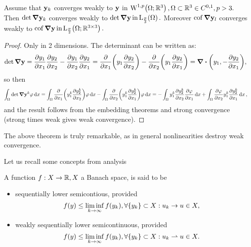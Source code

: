 \documentclass[11pt]{scrartcl} %
\begin{document}
\begin{theorem}[Magic]
	Assume that $\vb{y}_k$ converges weakly to $\vb{y}$ in $\WkpSet[1][p]{\Omega;\R^3}, \Omega \subset \R^3 \in C^{0,1}, p>3.$ Then $\det \grad \vb{y}_k$ converges weakly to $\det \grad \vb{y} \, \text{in} \, \LpSet[\frac{p}{3}]{\Omega}.$ Moreover $\operatorname{cof} \grad \vb{y}_l$ converges weakly to $\cof \grad \vb{y} \, \text{in} \, \LpSet[\frac{p}{2}]{\Omega;\R^{3 \times 3}}.$
\end{theorem}

\begin{proof}
	Only in 2 dimensions. The determinant can be written as:
	\[
		\det \grad \vb{y} = \pdv{y_1}{x_1}\pdv{y_2}{x_2}-\pdv{y_1}{x_2}\pdv{y_2}{x_1} = \pdv{x_1}\qty(y_1 \pdv{y_2}{x_2})-\pdv{x_2}\qty(y_1 \pdv{y_2}{x_1}) = \divergence{\qty(y_1,-\pdv{y_2}{x_1})},
	\]
	so then
	\[
		\int_{\Omega}\det \grad \vb{y}^k \varphi \dd{x} = \int_{\Omega}\pdv{x_1} \qty(y^k_1 \pdv{y_2^k}{x_2})\varphi\dd{x} - \int_{\Omega}\pdv{x_2}\qty(y^k_1 \pdv{y^k_2}{x_1})\varphi\dd{x} = -\int_{\Omega}y_1^k \pdv{y_2^k}{x_2}\pdv{\varphi}{x_1} \dd{x} + \int_{\Omega}\pdv{\varphi}{x_2} y_1^k \pdv{y_2^k}{x_1}\dd{x},
	\]
	and the result follows from the embedding theorems and strong convergence (strong times weak gives weak convergence).
\end{proof}

The above theorem is truly remarkable, as in general nonlinearities destroy weak convergence.

Let us recall some concepts from analysis

\begin{definition}
    A function $f: X \to {\mathbb R}, X$ a Banach space, is said to be
\begin{itemize}
	\item sequentially lower semicontious, provided
		\[
			f(y) \leq \liminf_{k \to \infty}f(y_k), \forall \qty{y_k} \subset X: u_k \to u \in X,
		\]
	\item weakly sequentially lower semicontinuous, provided
		\[
			f(y) \leq \liminf_{k \to \infty}f(y_k), \forall \qty{y_k} \subset X: u_k \rightharpoonup u \in X.
		\]
\end{itemize}
\end{definition}
\end{document}
